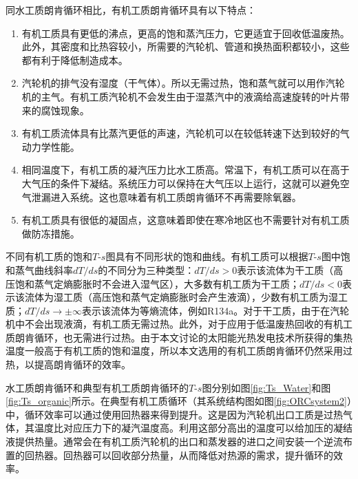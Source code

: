   同水工质朗肯循环相比，有机工质朗肯循环具有以下特点：
  \begin{enumerate}[label=(\arabic*)]
  \item 有机工质具有更低的沸点，更高的饱和蒸汽压力，它更适宜于回收低温废热。此外，其密度和比热容较小，所需要的汽轮机、管道和换热面积都较小，这些都有利于降低制造成本。
  \item 汽轮机的排气没有湿度（干气体）。所以无需过热，饱和蒸气就可以用作汽轮机的主气。有机工质汽轮机不会发生由于湿蒸汽中的液滴给高速旋转的叶片带来的腐蚀现象。
  \item 有机工质流体具有比蒸汽更低的声速，汽轮机可以在较低转速下达到较好的气动力学性能。
  \item 相同温度下，有机工质的凝汽压力比水工质高。常温下，有机工质可以在高于大气压的条件下凝结。系统压力可以保持在大气压以上运行，这就可以避免空气泄漏进入系统。这也意味着有机工质朗肯循环不再需要除氧器。
  \item 有机工质具有很低的凝固点，这意味着即使在寒冷地区也不需要针对有机工质做防冻措施。
  \end{enumerate}

不同有机工质的饱和$T$-$s$图具有不同形状的饱和曲线。有机工质可以根据$T$-$s$图中饱和蒸气曲线斜率$dT/ds$的不同分为三种类型：$dT / ds > 0$表示该流体为干工质（高压饱和蒸气定熵膨胀时不会进入湿气区），大多数有机工质为干工质；$dT / ds < 0$表示该流体为湿工质（高压饱和蒸气定熵膨胀时会产生液滴），少数有机工质为湿工质；$dT/ds \rightarrow \pm\infty$表示该流体为等熵流体，例如R134a。对于干工质，由于在汽轮机中不会出现液滴，有机工质无需过热。此外，对于应用于低温废热回收的有机工质朗肯循环，也无需进行过热。由于本文讨论的太阳能光热发电技术所获得的集热温度一般高于有机工质的饱和温度，所以本文选用的有机工质朗肯循环仍然采用过热，以提高朗肯循环的效率。

水工质朗肯循环和典型有机工质朗肯循环的$T$-$s$图分别如图\ref{fig:Ts_Water}和图\ref{fig:Ts_organic}所示。在典型有机工质循环（其系统结构图如图\ref{fig:ORCsystem2}）中，循环效率可以通过使用回热器来得到提升。这是因为汽轮机出口工质是过热气体，其温度比对应压力下的凝汽温度高。利用这部分高出的温度可以给加压的凝结液提供热量。通常会在有机工质汽轮机的出口和蒸发器的进口之间安装一个逆流布置的回热器。回热器可以回收部分热量，从而降低对热源的需求，提升循环的效率。


